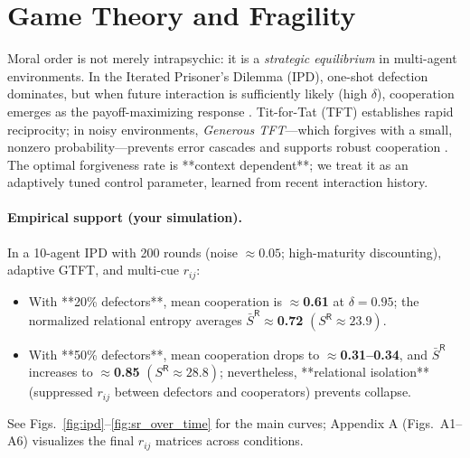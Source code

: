 \documentclass[11pt,a4paper]{article}
\begin{document}
\section{Game Theory and Fragility}
Moral order is not merely intrapsychic: it is a \emph{strategic equilibrium} in multi-agent environments. In the Iterated Prisoner’s Dilemma (IPD), one-shot defection dominates, but when future interaction is sufficiently likely (high $\delta$), cooperation emerges as the payoff-maximizing response \cite{Axelrod1984}. Tit-for-Tat (TFT) establishes rapid reciprocity; in noisy environments, \emph{Generous TFT}—which forgives with a small, nonzero probability—prevents error cascades and supports robust cooperation \cite{Nowak2006,MaynardSmith1982}. The optimal forgiveness rate is **context dependent**; we treat it as an adaptively tuned control parameter, learned from recent interaction history.

\paragraph{Empirical support (your simulation).} In a 10-agent IPD with 200 rounds (noise $\approx0.05$; high-maturity discounting), adaptive GTFT, and multi-cue $r_{ij}$:
\begin{itemize}
  \item With **20\% defectors**, mean cooperation is \(\approx\)\textbf{0.61} at \(\delta=0.95\); the normalized relational entropy averages \(\bar S^{\mathsf{R}}\approx\)\textbf{0.72} \((S^{\mathsf{R}}\approx 23.9)\).
  \item With **50\% defectors**, mean cooperation drops to \(\approx\)\textbf{0.31--0.34}, and \(\bar S^{\mathsf{R}}\) increases to \(\approx\)\textbf{0.85} \((S^{\mathsf{R}}\approx 28.8)\); nevertheless, **relational isolation** (suppressed $r_{ij}$ between defectors and cooperators) prevents collapse.
\end{itemize}
See Figs.~\ref{fig:ipd}–\ref{fig:sr_over_time} for the main curves; Appendix A (Figs.~A1–A6) visualizes the final \(r_{ij}\) matrices across conditions.
\end{document}
